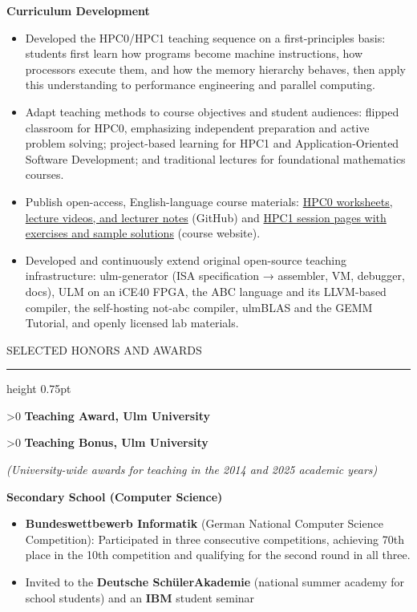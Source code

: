\documentclass[10pt]{article}
\newcommand{\headsize}{\fontsize{10.5pt}{12.8pt}\selectfont}  %
\newcommand{\smallsize}{\fontsize{9.5pt}{11.6pt}\selectfont}  %
\newcommand{\looser}{\linespread{1.0417}\selectfont}
\newcommand{\cvsection}[1]{%
  \par\vspace{9pt}%
  {\headsize\bfseries\color{heading}\strut#1\par}%
  \nopagebreak\vspace{1pt}%
  {\color{rule}\hrule height 0.75pt}%
  \nopagebreak\vspace{3pt}%
  \prevdepth=2.7pt\relax %
}
\newcommand{\cventry}[3][0]{%
  \par\vspace{4.5pt}%
  \ifnum#1>0 \needspace{#1\baselineskip}\fi
  {\bfseries #2}\hspace{0pt plus 1filll}{\smallsize #3}\par
  \nopagebreak\vspace{1pt}%
}
\newcommand{\cvlabel}[1]{%
  \par\vspace{3pt}%
  {\smallsize\bfseries #1\par}%
  \nopagebreak\vspace{1.5pt}%
}
\newcommand{\cvtext}[2][]{%
  {#1\looser #2\par}%
  \vspace{2pt}%
}
\newenvironment{cvitems}
  {\begin{itemize}[label=•, leftmargin=15pt, labelwidth=10pt, labelsep=0pt,
                   align=left, topsep=0pt, partopsep=0pt, parsep=0pt,
                   itemsep=1.5pt, beginpenalty=10000]\looser}
  {\end{itemize}\vspace{1.5pt}}
\begin{document}
\cvlabel{Curriculum Development}

\begin{cvitems}
  \item Developed the HPC0/HPC1 teaching sequence on a first-principles basis: students first learn how programs become machine instructions, how processors execute them, and how the memory hierarchy behaves, then apply this understanding to performance engineering and parallel computing.
  \item Adapt teaching methods to course objectives and student audiences: flipped classroom for HPC0, emphasizing independent preparation and active problem solving; project-based learning for HPC1 and Application-Oriented Software Development; and traditional lectures for foundational mathematics courses.
  \item Publish open-access, English-language course materials: \href{https://github.com/michael-lehn/not-abc/tree/main/hpc0-sessions}{HPC0 worksheets, lecture videos, and lecturer notes} (GitHub) and \href{https://www.mathematik.uni-ulm.de/numerik/hpc/ws25/}{HPC1 session pages with exercises and sample solutions} (course website).
  \item Developed and continuously extend original open-source teaching infrastructure: ulm-generator (ISA specification → assembler, VM, debugger, docs), ULM on an iCE40 FPGA, the ABC language and its LLVM-based compiler, the self-hosting not-abc compiler, ulmBLAS and the GEMM Tutorial, and openly licensed lab materials.
\end{cvitems}

\cvsection{SELECTED HONORS AND AWARDS}

\cventry{Teaching Award, Ulm University}{2015}

\cventry{Teaching Bonus, Ulm University}{2026}
\cvtext[\smallsize\itshape]{(University-wide awards for teaching in the 2014 and 2025 academic years)}

\cvlabel{Secondary School (Computer Science)}

\begin{cvitems}
  \item \textbf{Bundeswettbewerb Informatik} (German National Computer Science Competition): Participated in three consecutive competitions, achieving 70th place in the 10th competition and qualifying for the second round in all three.
  \item Invited to the \textbf{Deutsche SchülerAkademie} (national summer academy for school students) and an \textbf{IBM} student seminar
\end{cvitems}
\end{document}
